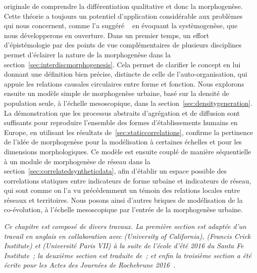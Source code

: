 originale de comprendre la différentiation qualitative et donc la morphogenèse. Cette théorie a toujours un potentiel d'application considérable aux problèmes qui nous concernent, comme l'a suggéré ~\cite{durand2003geographes} en évoquant la systèmogenèse, que nous développerons en ouverture. Dans un premier temps, un effort d'épistémologie par des points de vue complémentaires de plusieurs disciplines permet d'éclairer la nature de la morphogenèse dans la section~\ref{sec:interdiscmorphogenesis}. Cela permet de clarifier le concept en lui donnant une définition bien précise, distincte de celle de l'auto-organisation, qui appuie les relations causales circulaires entre forme et fonction. Nous explorons ensuite un modèle simple de morphogenèse urbaine, basé sur la densité de population seule, à l'échelle mesoscopique, dans la section~\ref{sec:densitygeneration}. La démonstration que les processus abstraits d'agrégation et de diffusion sont suffisants pour reproduire l'ensemble des formes d'établissements humains en Europe, en utilisant les résultats de~\ref{sec:staticcorrelations}, confirme la pertinence de l'idée de morphogenèse pour la modélisation à certaines échelles et pour les dimensions morphologiques. Ce modèle est ensuite couplé de manière séquentielle à un module de morphogenèse de réseau dans la section~\ref{sec:correlatedsyntheticdata}, afin d'établir un espace possible des correlations statiques entre indicateurs de forme urbaine et indicateurs de réseau, qui sont comme on l'a vu précédemment un témoin des relations locales entre réseaux et territoires. Nous posons ainsi d'autres briques de modélisation de la co-évolution, à l'échelle mesoscopique par l'entrée de la morphogenèse urbaine.





\stars


\textit{Ce chapitre est composé de divers travaux. La première section est adaptée d'un travail en anglais en collaboration avec  (University of California),  (Francis Crick Institute) et  (Université Paris VII) à la suite de l'école d'été 2016 du Santa Fe Institute~\cite{antelope2016interdisciplinary}; la deuxième section est traduite de~\cite{raimbault2017calibration}; et enfin la troisième section a été écrite pour les Actes des Journées de Rochebrune 2016~\cite{raimbault2016generation}.}



